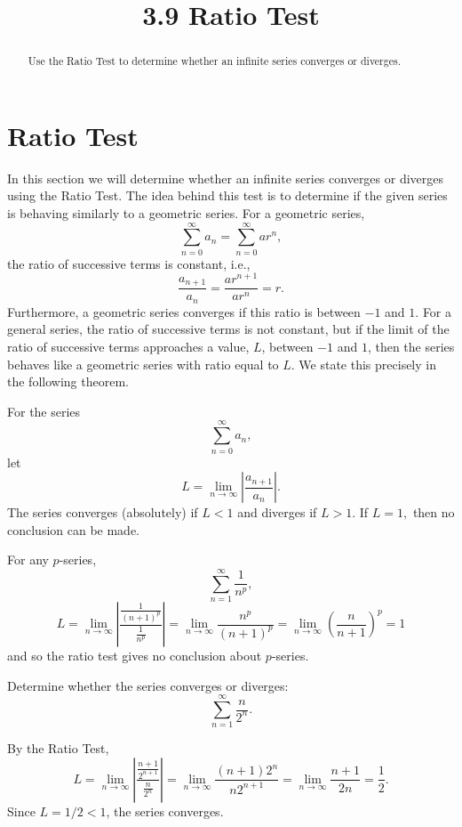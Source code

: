 \documentclass[handout]{ximera}
\title{3.9 Ratio Test}
\begin{document}
\begin{abstract}
Use the Ratio Test to determine whether an infinite series converges or diverges.
\end{abstract}

\maketitle

\section{Ratio Test}

In this section we will determine whether an infinite series converges or diverges using the Ratio Test. 
The idea behind this test is to determine if the given series is behaving similarly to a geometric series.
For a geometric series, 
\[
\sum_{n=0}^\infty a_n = \sum_{n=0}^\infty ar^n,
\]
the ratio of successive terms is constant, i.e., 
\[
\frac{a_{n+1}}{a_n} = \frac{ar^{n+1}}{ar^n} = r.
\]
Furthermore, a geometric series converges if this ratio is between $-1$ and $1$.
For a general series, the ratio of successive terms is not constant, but if the limit of the ratio of successive terms
approaches a value, $L$, between $-1$ and $1$, then the series behaves like a geometric series with ratio equal to $L$.
We state this precisely in the following theorem.

\begin{theorem}
For the series
\[
\sum_{n=0}^\infty a_n,
\]
let
\[
L = \lim_{n \to \infty} \left|\frac{a_{n+1}}{a_n}\right|.
\]
The series converges (absolutely) if $L < 1$ and diverges if $L>1$. 
If $L = 1,$ then no conclusion can be made.

\end{theorem}
 
\begin{remark}
For any $p$-series,
\[
\sum_{n=1}^\infty \frac{1}{n^p},
\]
\[
L =  \lim_{n \to \infty} \left|\frac{\frac{1}{(n+1)^p}}{\frac{1}{n^p}}\right| = \lim_{n \to \infty} \frac{n^p}{(n+1)^p} =  \lim_{n \to \infty} \left(\frac{n}{n+1}\right)^p = 1
\]
and so the ratio test gives no conclusion about $p$-series.
\end{remark}

\begin{example}[example 1]
Determine whether the series converges or diverges:
\[
\sum_{n=1}^\infty \frac{n}{2^n}.
\]

By the Ratio Test,
\[
L =  \lim_{n \to \infty} \left|\frac{\frac{n+1}{2^{n+1}}}{\frac{n}{2^n}}\right| =  \lim_{n \to \infty} \frac{(n+1)2^n}{n2^{n+1}} 
=  \lim_{n \to \infty} \frac{n+1}{2n} = \frac12.
\]
Since $L = 1/2 < 1$, the series converges.
\end{example}
\end{document}
